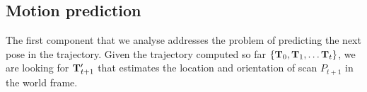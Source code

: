 







\subsection{Motion prediction}
\label{subsec:motion-prediction}


The first component that we analyse addresses the problem of predicting the next pose in the trajectory. Given the trajectory computed so far $\left\{\mathbf{T}_0, \mathbf{T}_1, \dots \mathbf{T}_t \right\}$, we are looking for $\mathbf{T}_{t+1}'$ that estimates the location and orientation of scan $P_{t+1}$ in the world frame.

